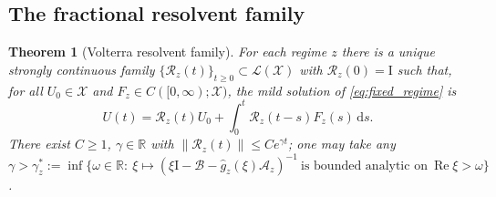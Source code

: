 \documentclass[11pt]{article}
\theoremstyle{plain}
\newtheorem{theorem}{Theorem}[section]
\theoremstyle{definition}
\theoremstyle{remark}
\newcommand{\R}{\mathbb{R}}
\newcommand{\X}{\mathcal{X}}
\newcommand{\Bop}{\mathcal{B}}
\newcommand{\Lop}{\mathcal{L}}
\newcommand{\Res}{\mathcal{R}}
\newcommand{\re}{\operatorname{Re}}
\newcommand{\norm}[1]{\left\lVert #1 \right\rVert}
\newcommand{\dd}{\mathrm{d}}
\newcommand{\Laplace}{\widehat}
\newcommand{\id}{\mathrm{I}}
\begin{document}
\subsection{The fractional resolvent family}

\begin{theorem}[Volterra resolvent family]
\label{thm:resolvent}
For each regime $z$ there is a unique strongly continuous family
$\{\Res_z(t)\}_{t\ge0}\subset\Lop(\X)$ with $\Res_z(0)=\id$ such that, for all $U_0\in\X$ and
$F_z\in C([0,\infty);\X)$, the mild solution of \eqref{eq:fixed_regime} is
\begin{equation}
\label{eq:resolvent_voc}
U(t)=\Res_z(t)U_0+\int_0^t\Res_z(t-s)F_z(s)\,\dd s .
\end{equation}
There exist $C\ge1$, $\gamma\in\R$ with $\norm{\Res_z(t)}\le Ce^{\gamma t}$; one may take any
$\gamma>\gamma_z^\ast:=\inf\{\omega\in\R:\ \xi\mapsto(\xi\id-\Bop-\Laplace g_z(\xi)\mathcal{A}_z)^{-1}\
\text{is bounded analytic on}\ \re\xi>\omega\}$.
\end{theorem}
\end{document}

